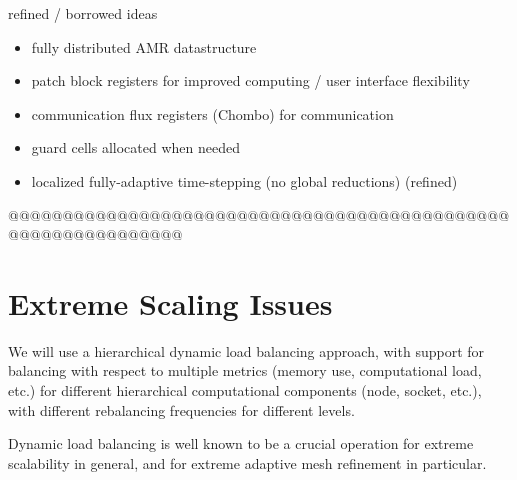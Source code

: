 \documentclass[14pt,letter]{article}
\begin{document}
refined  / borrowed ideas
\begin{itemize}
\item fully distributed AMR datastructure
\item patch block registers for improved computing / user interface flexibility
\item communication flux registers (Chombo) for communication
\item guard cells allocated when needed
\item localized fully-adaptive time-stepping (no global reductions) (refined)
\end{itemize}

@@@@@@@@@@@@@@@@@@@@@@@@@@@@@@@@@@@@@@@@@@@@@@@@@@@@@@@@@@@@@@

\section{Extreme Scaling Issues} \label{s:scaling}



We will use a hierarchical dynamic load balancing approach, with
support for balancing with respect to multiple metrics (memory use,
computational load, etc.) for different hierarchical computational
components (node, socket, etc.), with different rebalancing
frequencies for different levels.


Dynamic load balancing is well known to be a crucial operation for
extreme scalability in general, and for extreme adaptive mesh
refinement in particular.
\end{document}

